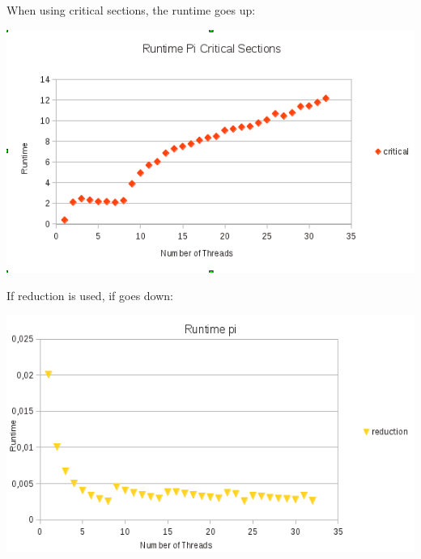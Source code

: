 \documentclass[a4paper,10pt]{article}
\begin{document}
When using critical sections, the runtime goes up:
\begin{center}
\includegraphics[]{pi_critical.png}
\end{center}
If reduction is used, if goes down:
\begin{center}
\includegraphics[]{pi_reduction.png}
\end{center}
\end{document}
